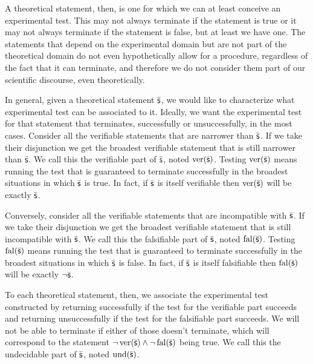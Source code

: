 \documentclass[11pt,letterpaper,fleqn]{memoir} %
\begin{document}
A theoretical statement, then, is one for which we can at least conceive an experimental test. This may not always terminate if the statement is true or it may not always terminate if the statement is false, but at least we have one. The statements that depend on the experimental domain but are not part of the theoretical domain do not even hypothetically allow for a procedure, regardless of the fact that it can terminate, and therefore we do not consider them part of our scientific discourse, even theoretically.

In general, given a theoretical statement $\bar{\mathsf{s}}$, we would like to characterize what experimental test can be associated to it. Ideally, we want the experimental test for that statement that terminates, successfully or unsuccessfully, in the most cases. Consider all the verifiable statements that are narrower than $\bar{\mathsf{s}}$. If we take their disjunction we get the broadest verifiable statement that is still narrower than $\bar{\mathsf{s}}$. We call this the verifiable part of $\bar{\mathsf{s}}$, noted $\operatorname{ver}(\bar{\mathsf{s}})$. Testing $\operatorname{ver}(\bar{\mathsf{s}})$ means running the test that is guaranteed to terminate successfully in the broadest situations in which $\bar{\mathsf{s}}$ is true. In fact, if $\bar{\mathsf{s}}$ is itself verifiable then $\operatorname{ver}(\bar{\mathsf{s}})$ will be exactly $\bar{\mathsf{s}}$.

Conversely, consider all the verifiable statements that are incompatible with $\bar{\mathsf{s}}$. If we take their disjunction we get the broadest verifiable statement that is still incompatible with $\bar{\mathsf{s}}$. We call this the falsifiable part of $\bar{\mathsf{s}}$, noted $\operatorname{fal}(\bar{\mathsf{s}})$. Testing $\operatorname{fal}(\bar{\mathsf{s}})$ means running the test that is guaranteed to terminate successfully in the broadest situations in which $\bar{\mathsf{s}}$ is false. In fact, if $\bar{\mathsf{s}}$ is itself falsifiable then $\operatorname{fal}(\bar{\mathsf{s}})$ will be exactly $\neg\bar{\mathsf{s}}$.

To each theoretical statement, then, we associate the experimental test constructed by returning successfully if the test for the verifiable part succeeds and returning unsuccessfully if the test for the falsifiable part succeeds. We will not be able to terminate if either of those doesn't terminate, which will correspond to the statement $\neg \operatorname{ver}(\bar{\mathsf{s}}) \wedge \neg \operatorname{fal}(\bar{\mathsf{s}})$ being true. We call this the undecidable part of $\bar{\mathsf{s}}$, noted $\operatorname{und}(\bar{\mathsf{s}})$.
\end{document}
